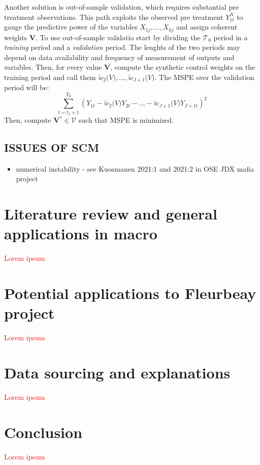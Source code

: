 \documentclass[12pt,a4paper,draft]{article}
\begin{document}
Another solution is out-of-sample validation, which requires substantial pre 
treatment observations. This path exploits the observed pre treatment $Y_{1t}^N$
to gauge the predictive power of the variables $X_{1j},...,X_{kj}$ and assign 
coherent weights $\mathbf{V}$. To use out-of-sample validatio start by 
dividing the $\mathcal{T}_0$ period in a \emph{training} period and a 
\emph{validation} period. The lenghts of the two periods may depend on data 
availability and frequency of measurement of outputs and variables. Then, for 
every value $\mathbf{V}$, compute the synthetic control weights on the training 
period and call them $\tilde{w}_2 \mathbf(V), ..., \tilde{w}_{J+1} \mathbf(V)$.
The MSPE over the validation period will be:
$$ \sum_{t=t_1+1}^{T_0} \left(
    Y_{1t}-\tilde{w}_2 \mathbf(V) Y_{2t} - ... - 
    \tilde{w}_{J+1} \mathbf(V) Y_{J+1t} \right)^2 $$
Then, compute $\mathbf{V}^* \in \mathcal{V}$ such that MSPE is minimized.


\subsection{ISSUES OF SCM}
\begin{itemize}
    \item numerical instability -  see Kuosmanen 2021:1 and 2021:2 in OSE JDX mafia project
\end{itemize}


\section{Literature review and general applications in macro}
\textcolor{red}{Lorem ipsum}




\section{Potential applications to Fleurbeay project}
\textcolor{red}{Lorem ipsum}




\section{Data sourcing and explanations}
\textcolor{red}{Lorem ipsum}




\section{Conclusion}
\textcolor{red}{Lorem ipsum}
\end{document}
